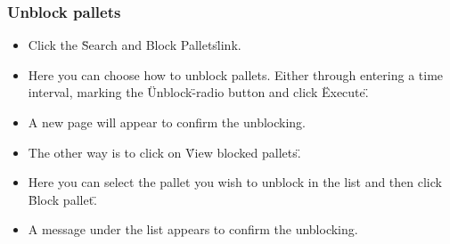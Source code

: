 \documentclass[a4paper]{article}
\begin{document}
\subsubsection{Unblock pallets}
\begin{itemize}
	\item Click the \"Search and Block Pallets\" link.
	\item Here you can choose how to unblock pallets. Either through entering a time interval, marking the \"Unblock\"-radio button and click \"Execute\". 
	\item A new page will appear to confirm the unblocking.
	\item The other way is to click on \"View blocked pallets\".
	\item Here you can select the pallet you wish to unblock in the list and then click \"Block pallet\".
	\item A message under the list appears to confirm the unblocking.
\end{itemize}
\end{document}
